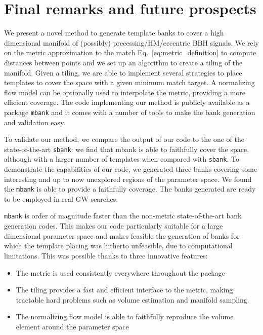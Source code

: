 \documentclass[twocolumn,showpacs,preprintnumbers,nofootinbib,prd,
superscriptaddress,10pt]{revtex4-2}
\begin{document}
\section{Final remarks and future prospects} \label{sec:conclusion}

We present a novel method to generate template banks to cover a high dimensional manifold of (possibly) precessing/HM/eccentric BBH signals.
We rely on the metric approximation to the match Eq.~\eqref{eq:metric_definition} to compute distances between points and we set up an algorithm to create a tiling of the manifold. Given a tiling, we are able to implement several strategies to place templates to cover the space with a given minimum match target.
A normalizing flow model can be optionally used to interpolate the metric, providing a more efficient coverage.
The code implementing our method is publicly available as a package \texttt{mbank} and it comes with a number of tools to make the bank generation and validation easy.

To validate our method, we compare the output of our code to the one of the state-of-the-art \texttt{sbank}: we find that mbank is able to faithfully cover the space, although with a larger number of templates when compared with \texttt{sbank}.
To demonstrate the capabilities of our code, we generated three banks covering some interesting and up to now unexplored regions of the parameter space. We found the \texttt{mbank} is able to provide a faithfully coverage.
The banks generated are ready to be employed in real GW searches.

\texttt{mbank} is order of magnitude faster than the non-metric state-of-the-art bank generation codes. This makes our code particularly suitable for a large dimensional parameter space and makes feasible the generation of banks for which the template placing was hitherto unfeasible, due to computational limitations.
This was possible thanks to three innovative features:
\begin{itemize}
	\item The metric is used consistently everywhere throughout the package
	\item The tiling provides a fast and efficient interface to the metric, making tractable hard problems such as volume estimation and manifold sampling.
	\item The normalizing flow model is able to faithfully reproduce the volume element around the parameter space
\end{itemize}
\end{document}
